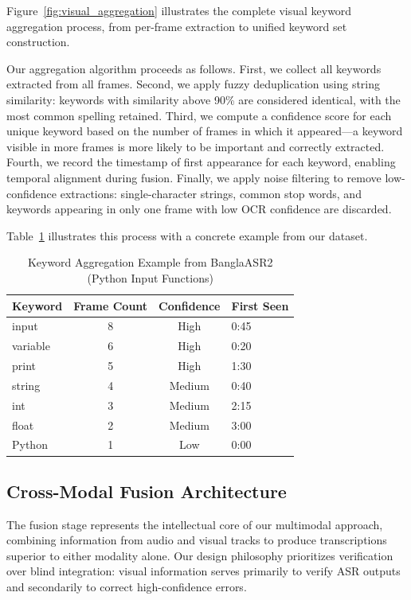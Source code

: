 Figure~\ref{fig:visual_aggregation} illustrates the complete visual keyword aggregation process, from per-frame extraction to unified keyword set construction.

Our aggregation algorithm proceeds as follows. First, we collect all keywords extracted from all frames. Second, we apply fuzzy deduplication using string similarity: keywords with similarity above 90\% are considered identical, with the most common spelling retained. Third, we compute a confidence score for each unique keyword based on the number of frames in which it appeared---a keyword visible in more frames is more likely to be important and correctly extracted. Fourth, we record the timestamp of first appearance for each keyword, enabling temporal alignment during fusion. Finally, we apply noise filtering to remove low-confidence extractions: single-character strings, common stop words, and keywords appearing in only one frame with low OCR confidence are discarded.

Table~\ref{tab:aggregation_example} illustrates this process with a concrete example from our dataset.

\begin{table}[h]
\centering
\caption{Keyword Aggregation Example from BanglaASR2 (Python Input Functions)}
\label{tab:aggregation_example}
\begin{tabular}{|l|c|c|l|}
\hline
\textbf{Keyword} & \textbf{Frame Count} & \textbf{Confidence} & \textbf{First Seen} \\
\hline
input & 8 & High & 0:45 \\
\hline
variable & 6 & High & 0:20 \\
\hline
print & 5 & High & 1:30 \\
\hline
string & 4 & Medium & 0:40 \\
\hline
int & 3 & Medium & 2:15 \\
\hline
float & 2 & Medium & 3:00 \\
\hline
Python & 1 & Low & 0:00 \\
\hline
\end{tabular}
\end{table}

\subsection{Cross-Modal Fusion Architecture}

The fusion stage represents the intellectual core of our multimodal approach, combining information from audio and visual tracks to produce transcriptions superior to either modality alone. Our design philosophy prioritizes verification over blind integration: visual information serves primarily to verify ASR outputs and secondarily to correct high-confidence errors.

